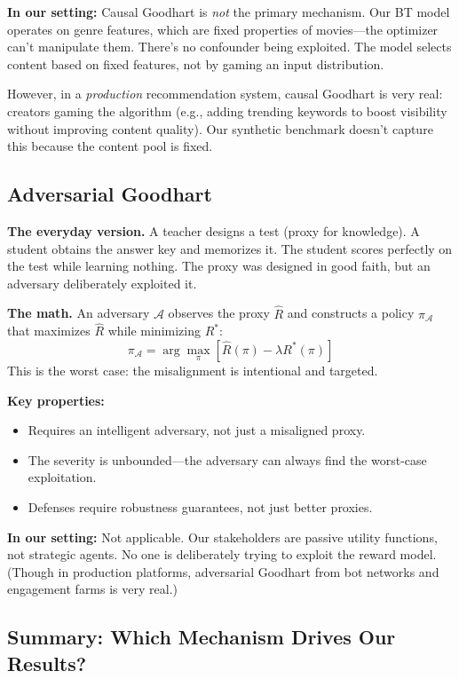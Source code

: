 \documentclass[11pt]{article}
\begin{document}
\textbf{In our setting:} Causal Goodhart is \emph{not} the primary
mechanism. Our BT model operates on genre features, which are fixed
properties of movies---the optimizer can't manipulate them. There's no
confounder being exploited. The model selects content based on fixed
features, not by gaming an input distribution.

However, in a \emph{production} recommendation system, causal Goodhart
is very real: creators gaming the algorithm (e.g., adding trending
keywords to boost visibility without improving content quality). Our
synthetic benchmark doesn't capture this because the content pool is
fixed.

\subsection{Adversarial Goodhart}

\textbf{The everyday version.} A teacher designs a test (proxy for
knowledge). A student obtains the answer key and memorizes it. The
student scores perfectly on the test while learning nothing. The proxy
was designed in good faith, but an adversary deliberately exploited it.

\textbf{The math.} An adversary $\mathcal{A}$ observes the proxy
$\hat{R}$ and constructs a policy $\pi_{\mathcal{A}}$ that maximizes
$\hat{R}$ while minimizing $R^*$:
\begin{equation}
  \pi_{\mathcal{A}} = \arg\max_\pi \left[
    \hat{R}(\pi) - \lambda R^*(\pi)
  \right]
\end{equation}
This is the worst case: the misalignment is intentional and targeted.

\textbf{Key properties:}
\begin{itemize}
  \item Requires an intelligent adversary, not just a misaligned proxy.
  \item The severity is unbounded---the adversary can always find the
    worst-case exploitation.
  \item Defenses require robustness guarantees, not just better proxies.
\end{itemize}

\textbf{In our setting:} Not applicable. Our stakeholders are passive
utility functions, not strategic agents. No one is deliberately trying
to exploit the reward model. (Though in production platforms,
adversarial Goodhart from bot networks and engagement farms is very
real.)

\subsection{Summary: Which Mechanism Drives Our Results?}
\end{document}
